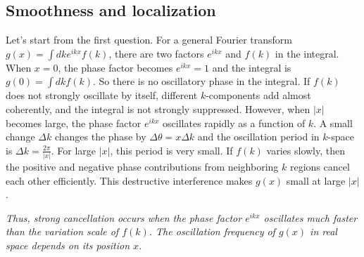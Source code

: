 \documentclass[12pt, oneside]{article}
\newcommand{\te}{\theta}
\newcommand{\p}[1]{\left(#1\right)}
\newcommand{\bv}[1]{\left|#1\right|}
\numberwithin{equation}{subsection}
\begin{document}
\subsection{Smoothness and localization}

Let's start from the first question. For a general Fourier transform \(g\p{x} = \int d k e^{i k x} f \p{k}\), there are two factors \(e^{i k x}\) and \(f \p{k}\) in the integral. When \(x = 0\), the phase factor becomes \(e^{i kx} = 1\) and the integral is \(g\p{0} = \int dk f \p{k}\). So there is no oscillatory phase in the integral. If \(f \p{k}\) does not strongly oscillate by itself, different \(k\)-components add almost coherently, and the integral is not strongly suppressed. However, when \(\bv{x}\) becomes large, the phase factor \(e^{i k x}\) oscillates rapidly as a function of \(k\). A small change \(\Delta k\) changes the phase by \(\Delta \te = x \Delta k\) and the oscillation period in \(k\)-space is \(\Delta k = \frac{2 \pi}{\bv{x}}\). For large \(\bv{x}\), this period is very small. If \(f \p{k}\) varies slowly, then the positive and negative phase contributions from neighboring \(k\) regions cancel each other efficiently. This destructive interference makes \(g\p{x}\) small at large \(\bv{x}\).

\textit{Thus, strong cancellation occurs when the phase factor \(e^{i kx}\) oscillates much faster than the variation scale of \(f \p{k}\). The oscillation frequency of \(g \p{x}\) in real space depends on its position \(x\).}
\end{document}
